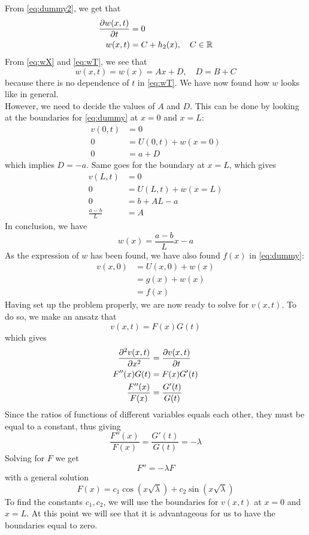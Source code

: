 \documentclass[12pt,english,a4paper]{article}
\begin{document}
From \vref{eq:dummy2}, we get that
\begin{align}
\pdv{w(x,t)}{t} &= 0 \nonumber \\
w(x,t) &= C + h_2(x) , \quad C \in \mathbb{R} \label{eq:wT}
\end{align}
From \vref{eq:wX} and \vref{eq:wT}, we see that 
\[
w(x,t) = w(x) = Ax + D, \quad D=B+C
\]
because there is no dependence of \(t\) in \vref{eq:wT}.
We have now found how \(w\) looks like in general. \\ 
However, we need to decide the values of \(A\) and \(D\). This can be done by looking at the boundaries for \vref{eq:dummy} at \(x = 0 \) and \(x = L\):
\begin{align*}
v(0,t) &= 0 \\
0 &= U(0,t) + w(x=0) \\
0 &= a+D
\end{align*}
which implies \(D = -a\). Same goes for the boundary at \(x = L\), which gives
\begin{align*}
v(L,t) &= 0 \\
0 &= U(L,t) + w(x=L) \\
0 &= b+AL-a \\
\frac{a-b}{L} &= A
\end{align*} 
In conclusion, we have 
\[
w(x) = \frac{a-b}{L}x - a
\]
As the expression of \(w\) has been found, we have also found \(f(x)\) in \vref{eq:dummy}:
\begin{align*}
	v(x,0) &= U(x,0) + w(x) \\
	&= g(x)+w(x) \\
	&=f(x)
\end{align*}
Having set up the problem properly, we are now ready to solve for \(v(x,t)\). To do so, we make an ansatz that 
\[
v(x,t) = F(x)G(t)
\]
which gives 
\begin{align}
\pdv[2]{v(x,t)}{x} &= \pdv{v(x,t)}{t} \nonumber \\
F''(x)G(t) &= F(x)G'(t) \nonumber \\
\frac{F''(x)}{F(x)} &= \frac{G'(t)}{G(t)} \label{eq:ration}
\end{align}
Since the ratios of functions of different variables equals each other, they must be equal to a constant, thus giving
\[
\frac{F''(x)}{F(x)} = \frac{G'(t)}{G(t)} = -\lambda
\]
Solving for \(F\) we get
\[
	F'' = -\lambda F
\]
with a general solution
\[
F(x) = c_1\cos(x\sqrt{\lambda} ) + c_2\sin(x\sqrt{\lambda})
\]
To find the constants \(c_1,c_2\), we will use the boundaries for \(v(x,t)\) at \(x = 0\) and \(x = L\). At this point we will see that it is advantageous for us to have the boundaries equal to zero.\\
\end{document}
